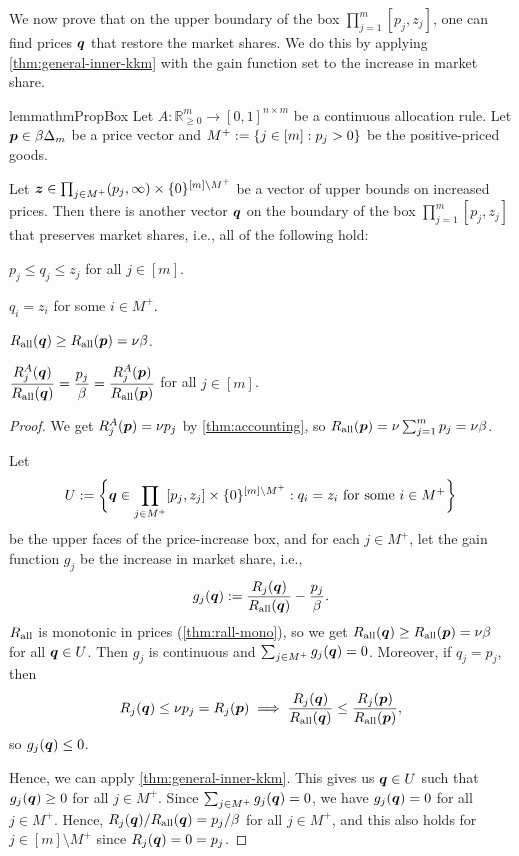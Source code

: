 We now prove that on the upper boundary of the box $\prod_{j=1}^m [p_j, z_j]$,
one can find prices $\bm{q}$ that restore the market shares.
We do this by applying \cref{thm:general-inner-kkm} with
the gain function set to the increase in market share.

\begin{restatable}{lemma}{thmPropBox}
\label{thm:prop-box}
Let $A: \mathbb{R}_{\ge 0}^m \to [0, 1]^{n \times m}$ be a continuous allocation rule.
Let $\bm{p} \in \beta\Delta_m$ be a price vector
and $M^+ := \{j \in [m]: p_j > 0\}$ be the positive-priced goods.

Let $\bm{z} \in \prod_{j \in M^+} (p_j, \infty) \times \{0\}^{[m] \setminus M^+}$
be a vector of upper bounds on increased prices.
Then there is another vector $\bm{q}$ on the boundary of the box $\prod_{j=1}^m [p_j, z_j]$
that preserves market shares, i.e., all of the following hold:
\begin{tightenum}
\item $p_j \le q_j \le z_j$ for all $j \in [m]$.
\item $q_i = z_i$ for some $i \in M^+$.
\item $R_{\operatorname{all}}(\bm{q}) \ge R_{\operatorname{all}}(\bm{p}) = \nu\beta$.
\item $\displaystyle \frac{R^A_j(\bm{q})}{R_{\operatorname{all}}(\bm{q})} = \frac{p_j}{\beta} = \frac{R^A_j(\bm{p})}{R_{\operatorname{all}}(\bm{p})}$
    for all $j \in [m]$.
\end{tightenum}
\end{restatable}
\begin{proof}
We get $R^A_j(\bm{p}) = \nu p_j$ by \cref{thm:accounting},
so $R_{\operatorname{all}}(\bm{p}) = \nu \sum_{j=1}^m p_j = \nu \beta$.

Let
\[ U := \bigg\{\bm{q} \in \prod_{j \in M^+} [p_j, z_j] \times \{0\}^{[m] \setminus M^+}:
    q_i = z_i \text{ for some } i \in M^+\bigg\} \]
be the upper faces of the price-increase box,
and for each $j \in M^+$, let the gain function $g_j$ be the increase in market share, i.e.,
\[ g_j(\bm{q}) := \frac{R_j(\bm{q})}{R_{\operatorname{all}}(\bm{q})} - \frac{p_j}{\beta}. \]
$R_{\operatorname{all}}$ is monotonic in prices (\cref{thm:rall-mono}),
so we get $R_{\operatorname{all}}(\bm{q}) \ge R_{\operatorname{all}}(\bm{p}) = \nu\beta$ for all $\bm{q} \in U$.
Then $g_j$ is continuous and $\sum_{j \in M^+} g_j(\bm{q}) = 0$.
Moreover, if $q_j = p_j$, then
\[ R_j(\bm{q}) \le \nu p_j = R_j(\bm{p})
    \implies \frac{R_j(\bm{q})}{R_{\operatorname{all}}(\bm{q})} \le \frac{R_j(\bm{p})}{R_{\operatorname{all}}(\bm{p})}, \]
so $g_j(\bm{q}) \le 0$.

Hence, we can apply \cref{thm:general-inner-kkm}.
This gives us $\bm{q} \in U$ such that $g_j(\bm{q}) \ge 0$ for all $j \in M^+$.
Since $\sum_{j \in M^+} g_j(\bm{q}) = 0$, we have $g_j(\bm{q}) = 0$ for all $j \in M^+$.
Hence, $R_j(\bm{q})/R_{\operatorname{all}}(\bm{q}) = p_j/\beta$ for all $j \in M^+$,
and this also holds for $j \in [m] \setminus M^+$ since $R_j(\bm{q}) = 0 = p_j$.
\end{proof}

